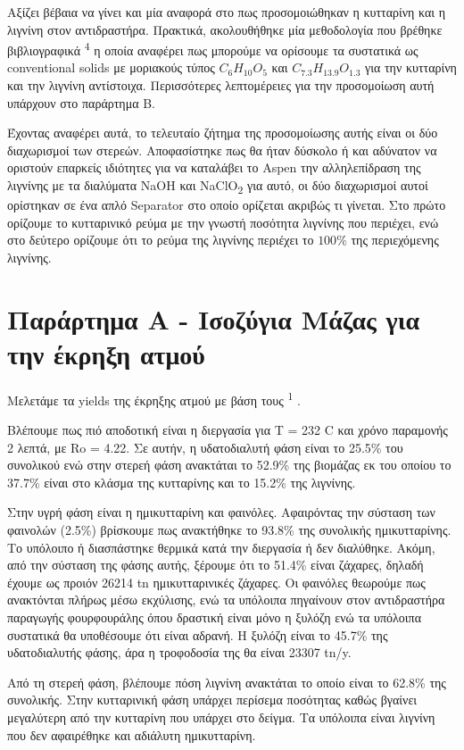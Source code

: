 \documentclass[11pt]{article}
\makeatletter
\newcommand{\citeprocitem}[2]{\hyper@linkstart{cite}{citeproc_bib_item_#1}#2\hyper@linkend}
\makeatother
\begin{document}
Αξίζει βέβαια να γίνει και μία αναφορά στο πως προσομοιώθηκαν η κυτταρίνη και η λιγνίνη στον αντιδραστήρα. Πρακτικά, ακολουθήθηκε μία μεθοδολογία που βρέθηκε βιβλιογραφικά \textsuperscript{\citeprocitem{4}{4}} η οποία αναφέρει πως μπορούμε να ορίσουμε τα συστατικά ως conventional solids με μοριακούς τύπος \(C_6H_{10}O_5\) και \(C_{7.3}H_{13.9}O_{1.3}\) για την κυτταρίνη και την λιγνίνη αντίστοιχα. Περισσότερες λεπτομέρειες για την προσομοίωση αυτή υπάρχουν στο παράρτημα B.

Έχοντας αναφέρει αυτά, το τελευταίο ζήτημα της προσομοίωσης αυτής είναι οι δύο διαχωρισμοί των στερεών. Αποφασίστηκε πως θα ήταν δύσκολο ή και αδύνατον να οριστούν επαρκείς ιδιότητες για να καταλάβει το Aspen την αλληλεπίδραση της λιγνίνης με τα διαλύματα NaOH και NaClO\textsubscript{2} για αυτό, οι δύο διαχωρισμοί αυτοί ορίστηκαν σε ένα απλό Separator στο οποίο ορίζεται ακριβώς τι γίνεται. Στο πρώτο ορίζουμε το κυτταρινικό ρεύμα με την γνωστή ποσότητα λιγνίνης που περιέχει, ενώ στο δεύτερο ορίζουμε ότι το ρεύμα της λιγνίνης περιέχει το \(100 \%\) της περιεχόμενης λιγνίνης.

\section{Παράρτημα Α - Ισοζύγια Μάζας για την έκρηξη ατμού}
\label{sec:orgda15a80}
Μελετάμε τα yields της έκρηξης ατμού με βάση τους \textsuperscript{\citeprocitem{1}{1}} .

Βλέπουμε πως πιό αποδοτική είναι η διεργασία για Τ = 232 C και χρόνο παραμονής 2 λεπτά, με Ro = 4.22. Σε αυτήν, η υδατοδιαλυτή φάση είναι το 25.5\% του συνολικού ενώ στην στερεή φάση ανακτάται το 52.9\% της βιομάζας εκ του οποίου το 37.7\% είναι στο κλάσμα της κυτταρίνης και το 15.2\% της λιγνίνης.

Στην υγρή φάση είναι η ημικυτταρίνη και φαινόλες. Αφαιρόντας την σύσταση των φαινολών (2.5\%) βρίσκουμε πως ανακτήθηκε το 93.8\% της συνολικής ημικυτταρίνης. Το υπόλοιπο ή διασπάστηκε θερμικά κατά την διεργασία ή δεν διαλύθηκε. Ακόμη, από την σύσταση της φάσης αυτής, ξέρουμε ότι το 51.4\% είναι ζάχαρες, δηλαδή έχουμε ως προιόν 26214 tn ημικυτταρινικές ζάχαρες. Οι φαινόλες θεωρούμε πως ανακτόνται πλήρως μέσω εκχύλισης, ενώ τα υπόλοιπα πηγαίνουν στον αντιδραστήρα παραγωγής φουρφουράλης όπου δραστική είναι μόνο η ξυλόζη ενώ τα υπόλοιπα συστατικά θα υποθέσουμε ότι είναι αδρανή. Η ξυλόζη είναι το 45.7\% της υδατοδιαλυτής φάσης, άρα η τροφοδοσία της θα είναι 23307 tn/y.

Από τη στερεή φάση, βλέπουμε πόση λιγνίνη ανακτάται το οποίο είναι το 62.8\% της συνολικής. Στην κυτταρινική φάση υπάρχει περίσεμα ποσότητας καθώς βγαίνει μεγαλύτερη από την κυτταρίνη που υπάρχει στο δείγμα. Τα υπόλοιπα είναι λιγνίνη που δεν αφαιρέθηκε και αδιάλυτη ημικυτταρίνη.
\end{document}
